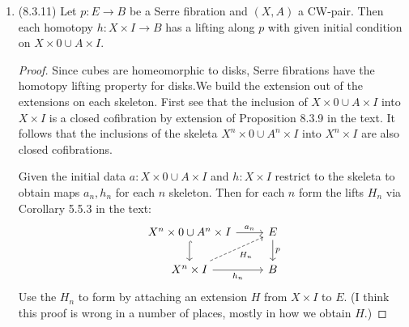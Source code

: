 \documentclass[11pt]{article}
\begin{document}
\begin{enumerate}
\begin{proof}
      Furthermore, observe that a subset $U$ of $X/A$ is open in $X/A$ if its preimage $V$ under the quotient map is open in $X$, meaning any intersection of $V$ with any of the skeleta of $X$ or $A$ has to be open also. This means in particular that the intersection of $U$ with any skeleton $X^n/A^n$ has to be open, meaning $X/A$ has the colimit topology with respect to its skeleta.
    \end{proof}
    \item (8.3.11) Let $p\colon E\to B$ be a Serre fibration and $(X,A)$ a CW-pair. Then each homotopy $h\colon X\times I\to B$ has a lifting along $p$ with given initial condition on $X\times 0\cup A\times I$. \begin{proof}
      Since cubes are homeomorphic to disks, Serre fibrations have the homotopy lifting property for disks.We build the extension out of the extensions on each skeleton. First see that the inclusion of $X\times 0\cup A\times I$ into $X\times I$ is a closed cofibration by extension of Proposition 8.3.9 in the text. It follows that the inclusions of the skeleta $X^n\times 0\cup A^n\times I$ into $X^n\times I$ are also closed cofibrations.

      Given the initial data $a\colon X\times 0\cup A\times I$ and $h\colon X\times I$ restrict to the skeleta to obtain maps $a_n,h_n$ for each $n$ skeleton. Then for each $n$ form the lifts $H_n$ via Corollary 5.5.3 in the text: %
      \[\begin{tikzcd}
        {X^n\times0\cup A^n\times I} & E \\
        {X^n\times I} & B
        \arrow["p", from=1-2, to=2-2]
        \arrow["{h_n}"', from=2-1, to=2-2]
        \arrow[hook, from=1-1, to=2-1]
        \arrow["{a_n}", from=1-1, to=1-2]
        \arrow["{H_n}"', dashed, from=2-1, to=1-2]
      \end{tikzcd}\] Use the $H_n$ to form by attaching an extension $H$ from $X\times I$ to $E$. (I think this proof is wrong in a number of places, mostly in how we obtain $H$.)
    \end{proof}
\end{enumerate}
\end{document}
